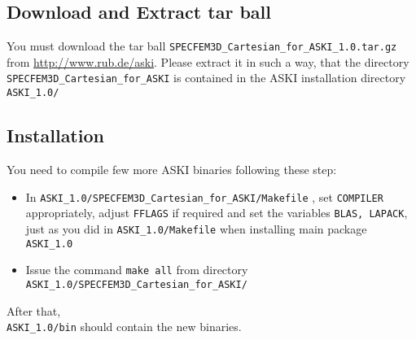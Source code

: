 \documentclass[12pt,a4paper]{article}
\newcommand{\lcode}[1]{\nolinkurl{#1}}
\newcommand{\lcodetitle}[1]{ {\ttfamily #1} }
\newcommand{\ASKI}{ {\ttfamily ASKI} }
\begin{document}
\subsection{Download and Extract \lcodetitle{tar} ball} %
You must download the tar ball
\lcode{SPECFEM3D_Cartesian_for_ASKI_1.0.tar.gz}
from \url{http://www.rub.de/aski}. Please extract it in such a way, that the directory 
\lcode{SPECFEM3D_Cartesian_for_ASKI} is contained in the \ASKI installation directory 
\lcode{ASKI_1.0/}

\subsection{Installation} %
You need to compile few more \ASKI binaries following these step:
\begin{itemize}
\item In \lcode{ASKI_1.0/SPECFEM3D_Cartesian_for_ASKI/Makefile} , set \lcode{COMPILER} appropriately, 
   adjust \lcode{FFLAGS} if required and set the variables \lcode{BLAS, LAPACK}, just as you did 
   in \lcode{ASKI_1.0/Makefile} when installing main package \lcode{ASKI_1.0}
\item 
 Issue the command \lcode{make all} from directory \lcode{ASKI_1.0/SPECFEM3D_Cartesian_for_ASKI/}
\end{itemize}
After that, \\\lcode{ASKI_1.0/bin} should contain the new binaries.

\end{document}

